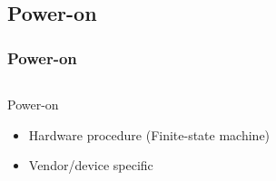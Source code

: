 \documentclass{beamer}
\begin{document}
\subsection{Power-on}
\begin{frame}
\frametitle{Power-on}
  \begin{columns}[C]
    \begin{column}{5cm}
      \begin{block}{Power-on}
        \begin{itemize}
        \item Hardware procedure (Finite-state machine)
        \item Vendor/device specific
        \end{itemize}  
      \end{block}
    \end{column}
  \end{columns}
\end{frame}
\end{document}
